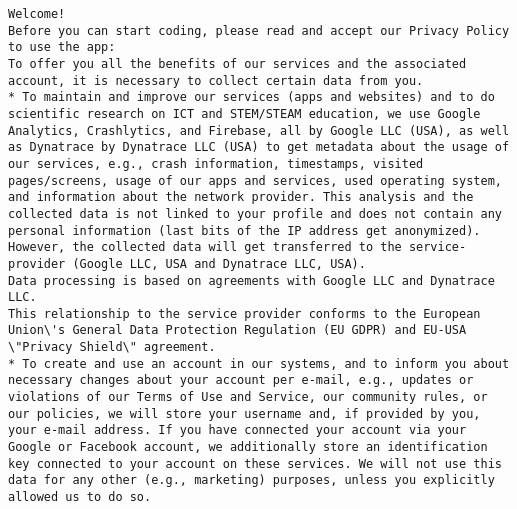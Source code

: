 

\begin{multicols}{3}

\begin{lstlisting}[caption={Privacy Policy for Pocket Code},captionpos=b,label={pocketcode-privacypolicy}]
Welcome!
Before you can start coding, please read and accept our Privacy Policy to use the app:
To offer you all the benefits of our services and the associated account, it is necessary to collect certain data from you.
* To maintain and improve our services (apps and websites) and to do scientific research on ICT and STEM/STEAM education, we use Google Analytics, Crashlytics, and Firebase, all by Google LLC (USA), as well as Dynatrace by Dynatrace LLC (USA) to get metadata about the usage of our services, e.g., crash information, timestamps, visited pages/screens, usage of our apps and services, used operating system, and information about the network provider. This analysis and the collected data is not linked to your profile and does not contain any personal information (last bits of the IP address get anonymized). However, the collected data will get transferred to the service-provider (Google LLC, USA and Dynatrace LLC, USA). 
Data processing is based on agreements with Google LLC and Dynatrace LLC. 
This relationship to the service provider conforms to the European Union\'s General Data Protection Regulation (EU GDPR) and EU-USA \"Privacy Shield\" agreement.
* To create and use an account in our systems, and to inform you about necessary changes about your account per e-mail, e.g., updates or violations of our Terms of Use and Service, our community rules, or our policies, we will store your username and, if provided by you, your e-mail address. If you have connected your account via your Google or Facebook account, we additionally store an identification key connected to your account on these services. We will not use this data for any other (e.g., marketing) purposes, unless you explicitly allowed us to do so.

\end{lstlisting}
\end{multicols}
